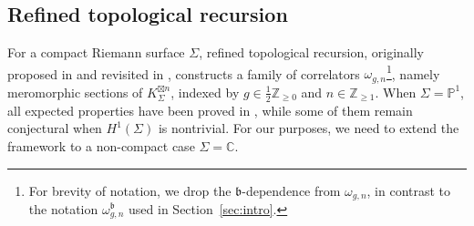 \documentclass[12pt]{amsart}
\theoremstyle{plain}
\theoremstyle{definition}
\theoremstyle{remark}
\numberwithin{equation}{section}
\begin{document}



\subsection{Refined topological recursion}\label{sec:RTR}
For a compact Riemann surface $\Sigma$, refined topological recursion, originally proposed in \cite{CE06} and revisited in \cite{KO22,Osu23-1}, constructs a family of correlators $\omega_{g,n}$\footnote{For brevity of notation, we drop the $\mathfrak{b}$-dependence from $\omega_{g,n}$, in contrast to the notation $\omega_{g,n}^\mathfrak{b}$ used in Section~\ref{sec:intro}.}, namely meromorphic sections of $K_\Sigma^{\boxtimes n}$, indexed by $g\in\frac12\mathbb{Z}_{\geq0}$ and $n\in\mathbb{Z}_{\geq1}$. When $\Sigma=\mathbb{P}^1$, all expected properties have been proved in  \cite{KO22,Osu23-1,Osu23-2}, while some of them remain conjectural when $H^1(\Sigma)$ is nontrivial. For our purposes, we need to extend the framework to a non-compact case $\Sigma=\mathbb{C}$.%
 
\end{document}
